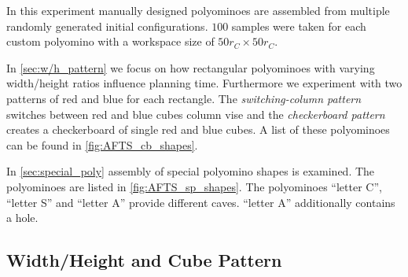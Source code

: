 In this experiment manually designed polyominoes are assembled from multiple randomly generated initial configurations.
$100$ samples were taken for each custom polyomino with a workspace size of $50 r_C \times 50 r_C$.

In \autoref{sec:w/h_pattern} we focus on how rectangular polyominoes with varying width/height ratios influence planning time.
Furthermore we experiment with two patterns of red and blue for each rectangle.
The \textit{switching-column pattern} switches between red and blue cubes column vise and the \textit{checkerboard pattern} creates a checkerboard of single red and blue cubes.
A list of these polyominoes can be found in \autoref{fig:AFTS_cb_shapes}.

In \autoref{sec:special_poly} assembly of special polyomino shapes is examined. 
The polyominoes are listed in \autoref{fig:AFTS_sp_shapes}.
The polyominoes ``letter C'', ``letter S'' and ``letter A'' provide different caves.
``letter A'' additionally contains a hole. 

\subsection{Width/Height and Cube Pattern}
\label{sec:w/h_pattern}




